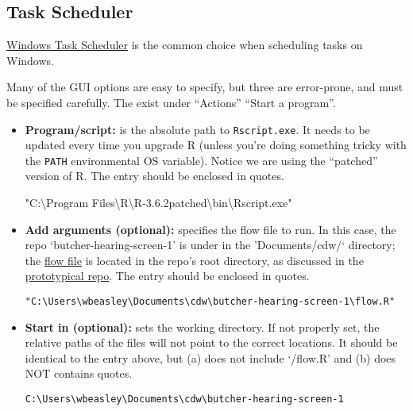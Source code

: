 \documentclass[
]{book}
\newenvironment{Shaded}{\begin{snugshade}}{\end{snugshade}}
\newcommand{\StringTok}[1]{\textcolor[rgb]{0.31,0.60,0.02}{#1}}
\begin{document}
\hypertarget{automation-task-scheduler}{%
\subsection{Task Scheduler}\label{automation-task-scheduler}}

\href{https://en.wikipedia.org/wiki/Windows_Task_Scheduler}{Windows Task Scheduler} is the common choice when scheduling tasks on Windows.

Many of the GUI options are easy to specify, but three are error-prone, and must be specified carefully. The exist under ``Actions'' \textbar{} ``Start a program''.

\begin{itemize}
\item
  \textbf{Program/script:} is the absolute path to \texttt{Rscript.exe}. It needs to be updated every time you upgrade R (unless you're doing something tricky with the \texttt{PATH} environmental OS variable). Notice we are using the ``patched'' version of R. The entry should be enclosed in quotes.

\begin{Shaded}
\begin{Highlighting}[]
\StringTok{"C:\textbackslash{}Program Files\textbackslash{}R\textbackslash{}R{-}3.6.2patched\textbackslash{}bin\textbackslash{}Rscript.exe"}
\end{Highlighting}
\end{Shaded}
\item
  \textbf{Add arguments (optional):} specifies the flow file to run. In this case, the repo `butcher-hearing-screen-1' is under in the 'Documents/cdw/` directory; the \protect\hyperlink{automation-flow}{flow file} is located in the repo's root directory, as discussed in the \protect\hyperlink{repo-flow}{prototypical repo}. The entry should be enclosed in quotes.

\begin{verbatim}
"C:\Users\wbeasley\Documents\cdw\butcher-hearing-screen-1\flow.R"
\end{verbatim}
\item
  \textbf{Start in (optional):} sets the working directory. If not properly set, the relative paths of the files will not point to the correct locations. It should be identical to the entry above, but (a) does not include `/flow.R' and (b) does NOT contains quotes.

\begin{verbatim}
C:\Users\wbeasley\Documents\cdw\butcher-hearing-screen-1
\end{verbatim}
\end{itemize}
\end{document}
